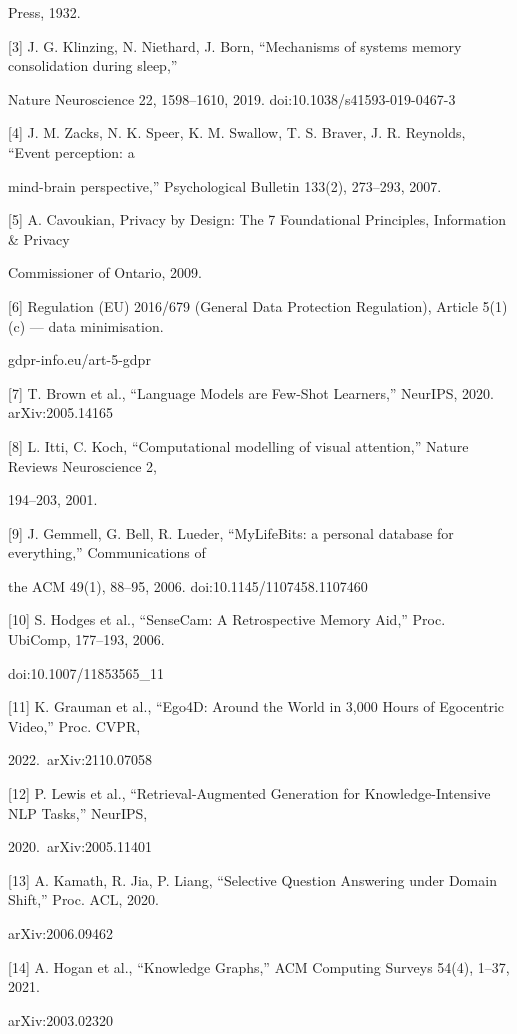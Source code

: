 Press, 1932.

{[}3{]} J. G. Klinzing, N. Niethard, J. Born, ``Mechanisms of systems memory consolidation during sleep,''

Nature Neuroscience 22, 1598--1610, 2019. doi:10.1038/s41593-019-0467-3

{[}4{]} J. M. Zacks, N. K. Speer, K. M. Swallow, T. S. Braver, J. R. Reynolds, ``Event perception: a

mind-brain perspective,'' Psychological Bulletin 133(2), 273--293, 2007.

{[}5{]} A. Cavoukian, Privacy by Design: The 7 Foundational Principles, Information \& Privacy

Commissioner of Ontario, 2009.

{[}6{]} Regulation (EU) 2016/679 (General Data Protection Regulation), Article 5(1)(c) --- data minimisation.

gdpr-info.eu/art-5-gdpr

{[}7{]} T. Brown et al., ``Language Models are Few-Shot Learners,'' NeurIPS, 2020. arXiv:2005.14165

{[}8{]} L. Itti, C. Koch, ``Computational modelling of visual attention,'' Nature Reviews Neuroscience 2,

194--203, 2001.

{[}9{]} J. Gemmell, G. Bell, R. Lueder, ``MyLifeBits: a personal database for everything,'' Communications of

the ACM 49(1), 88--95, 2006. doi:10.1145/1107458.1107460

{[}10{]} S. Hodges et al., ``SenseCam: A Retrospective Memory Aid,'' Proc. UbiComp, 177--193, 2006.

doi:10.1007/11853565\_11

{[}11{]} K. Grauman et al., ``Ego4D: Around the World in 3,000 Hours of Egocentric Video,'' Proc. CVPR,

2022.~arXiv:2110.07058

{[}12{]} P. Lewis et al., ``Retrieval-Augmented Generation for Knowledge-Intensive NLP Tasks,'' NeurIPS,

2020.~arXiv:2005.11401

{[}13{]} A. Kamath, R. Jia, P. Liang, ``Selective Question Answering under Domain Shift,'' Proc. ACL, 2020.

arXiv:2006.09462

{[}14{]} A. Hogan et al., ``Knowledge Graphs,'' ACM Computing Surveys 54(4), 1--37, 2021.

arXiv:2003.02320


